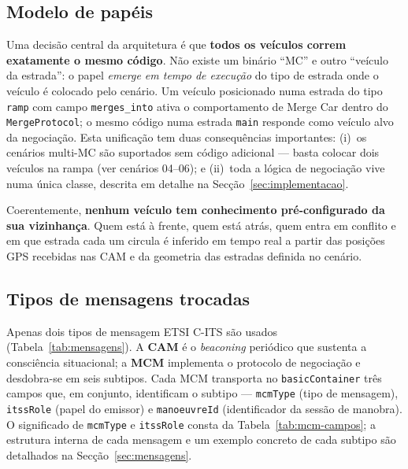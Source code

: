 \documentclass[11pt,a4paper]{article}
\begin{document}
\subsection{Modelo de papéis}

Uma decisão central da arquitetura é que \textbf{todos os veículos correm exatamente o
mesmo código}. Não existe um binário ``MC'' e outro ``veículo da estrada'': o papel
\emph{emerge em tempo de execução} do tipo de estrada onde o veículo é colocado pelo
cenário. Um veículo posicionado numa estrada do tipo \texttt{ramp} com campo
\texttt{merges\_into} ativa o comportamento de Merge Car dentro do
\texttt{MergeProtocol}; o mesmo código numa estrada \texttt{main} responde como veículo
alvo da negociação. Esta unificação tem duas consequências importantes: (i)~os cenários
multi-MC são suportados sem código adicional --- basta colocar dois veículos na rampa
(ver cenários 04--06); e (ii)~toda a lógica de negociação vive numa única classe,
descrita em detalhe na Secção~\ref{sec:implementacao}.

Coerentemente, \textbf{nenhum veículo tem conhecimento pré-configurado da sua
vizinhança}. Quem está à frente, quem está atrás, quem entra em conflito e em que
estrada cada um circula é inferido em tempo real a partir das posições GPS recebidas nas
CAM e da geometria das estradas definida no cenário.

\subsection{Tipos de mensagens trocadas}

Apenas dois tipos de mensagem ETSI C-ITS são usados (Tabela~\ref{tab:mensagens}). A
\textbf{CAM} é o \emph{beaconing} periódico que sustenta a consciência situacional; a
\textbf{MCM} implementa o protocolo de negociação e desdobra-se em seis subtipos. Cada
MCM transporta no \texttt{basicContainer} três campos que, em conjunto, identificam o
subtipo --- \texttt{mcmType} (tipo de mensagem), \texttt{itssRole} (papel do emissor) e
\texttt{manoeuvreId} (identificador da sessão de manobra). O significado de
\texttt{mcmType} e \texttt{itssRole} consta da Tabela~\ref{tab:mcm-campos}; a estrutura
interna de cada mensagem e um exemplo concreto de cada subtipo são detalhados na
Secção~\ref{sec:mensagens}.
\end{document}

